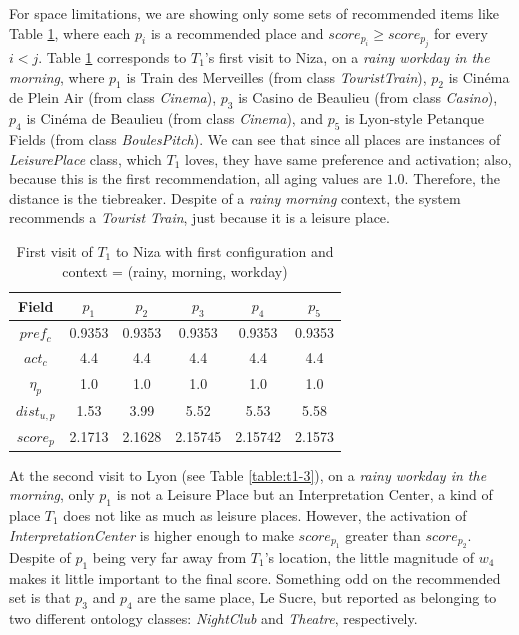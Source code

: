 For space limitations, we are showing only some sets of recommended items like Table \ref{table:t1-1}, where each $p_i$ is a recommended place and $score_{p_i} \ge score_{p_j}$ for every $i < j$. Table \ref{table:t1-1} corresponds to $T_1$'s first visit to Niza, on a {\it rainy workday in the morning}, where $p_1$ is Train des Merveilles (from class \textit{TouristTrain}), $p_2$ is Cinéma de Plein Air (from class \textit{Cinema}), $p_3$ is Casino de Beaulieu (from class \textit{Casino}), $p_4$ is Cinéma de Beaulieu (from class \textit{Cinema}), and $p_5$ is Lyon-style Petanque Fields (from class \textit{BoulesPitch}). We can see that since all places
are instances
of \textit{LeisurePlace} class, which $T_1$ loves, they have same preference and activation; also, because
this is the first recommendation, all aging values are $1.0$. Therefore, the distance is the tiebreaker. Despite of a {\it rainy morning} context, the system recommends a {\it Tourist Train}, 
just because it is a leisure place.
\begin{table}[h!]
    \centering
        \caption{First visit of $T_1$ to Niza with first configuration and context = (rainy, morning, workday)}
    \label{table:t1-1}
    \begin{tabular}{ |c|c|c|c|c|c| } 
        \hline
        Field   & $p_1$ & $p_2$ & $p_3$ & $p_4$ & $p_5$ \\
        \hline
        $pref_c$    &  0.9353 & 0.9353 & 0.9353 & 0.9353 & 0.9353 \\
        $act_c$     & 4.4 & 4.4 & 4.4 & 4.4 & 4.4 \\
        $\eta_p$    & 1.0 & 1.0 & 1.0 & 1.0 & 1.0 \\
        $dist_{u,p}$ & 1.53 & 3.99 & 5.52 & 5.53 & 5.58 \\
        $score_p$    & 2.1713 & 2.1628 & 2.15745 & 2.15742 & 2.1573 \\
        
        \hline
    \end{tabular}
\end{table}


At the second visit to Lyon (see Table \ref{table:t1-3}), on a {\it rainy workday in the morning}, only $p_1$ is not a Leisure Place but an Interpretation Center, a kind of place $T_1$ does not like as much as leisure places. However, the activation of \textit{InterpretationCenter} is higher enough to make $score_{p_1}$ greater than $score_{p_2}$. Despite of $p_1$ being very far away from $T_1$'s location, the little magnitude of $w_4$ makes it little important to the final score. Something odd on the recommended set is that $p_3$ and $p_4$ are the same place, Le Sucre, but reported as belonging to two different ontology classes: \textit{NightClub} and \textit{Theatre}, respectively.

